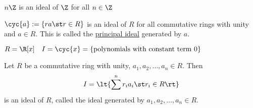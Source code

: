 \begin{example}
  \( n\Z \) is an ideal of \( \Z \) for all \( n\in\Z \)
\end{example}

\begin{example}
  \( \cyc{a}:=\{ra\st r\in R\} \) is an ideal of \( R \) for all commutative rings with unity and \( a\in R \). This is called the \ul{principal ideal} generated by \( a \).
\end{example}

\begin{example}
  \( R=\R[x]\quad I=\cyc{x}= \{\text{polynomials with constant term 0}\} \)
\end{example}

\begin{example}
  Let \( R \) be a commutative ring with unity, \( a_1,a_2,\ldots,a_n\in R \). Then
  \begin{align*}
    I = \lt\{\sum^n  r_ia_i \st r_i\in R\rt\}
  \end{align*}
  is an ideal of \( R \), called the ideal generated by \( a_1,a_2,\ldots,a_n\in R \).
\end{example}
